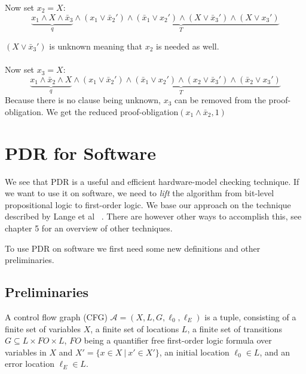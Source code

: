 \documentclass[11pt, a4paper, BCOR=10mm, ngerman]{scrbook}
\begin{document}
Now set $x_2 = X$: \\
\begin{equation*}
\underbrace{x_1 \land X \land \bar x_3}_{q} \land \underbrace{(x_1 \lor \bar x_2' ) \land ( \bar x_1 \lor x_2') \land (X \lor \bar x_3') \land ( X \lor x_3')}_{T}
\end{equation*}

$(X \lor \bar x_3')$ is unknown meaning that $x_2$  is needed as well. \\ \\

Now set $x_3 = X$: \\
\begin{equation*}
\underbrace{x_1 \land \bar x_2 \land X}_{q} \land \underbrace{(x_1 \lor \bar x_2' ) \land ( \bar x_1 \lor x_2') \land (x_2 \lor \bar x_3') \land ( \bar x_2 \lor x_3')}_{T}
\end{equation*}
Because there is no clause being unknown, $x_3$ can be removed from the proof-obligation. We get the reduced proof-obligation$(x_1 \land \bar x_2, 1)$

\pagebreak


\chapter{PDR for Software} \label{sec3}
We see that PDR is a useful and efficient hardware-model checking technique. If we want to use it on software, we need to \textsl{lift} the algorithm from bit-level propositional logic to first-order logic. We base our approach on the technique described by Lange et al ~\cite{DBLP:conf/fmcad/0001NN15}. There are however other ways to accomplish this, see chapter 5 for an overview of other techniques. \par To use PDR on software we first need some new definitions and other preliminaries.

\section{Preliminaries}
A control flow graph (CFG) $\mathcal{A} = (X, L, G, \ell_0, \ell_E)$ is a tuple, consisting of a finite set of variables $X$, a finite set of locations $L$, a finite set of transitions $G \subseteq L \times FO \times L$, $FO$ being a quantifier free first-order logic formula over variables in $X$ and $X' = \{x \in X \ | \ x' \in X'\}$, an initial location $\ell_0 \in L$, and an error location $\ell_E \in L$.\par
\end{document}
